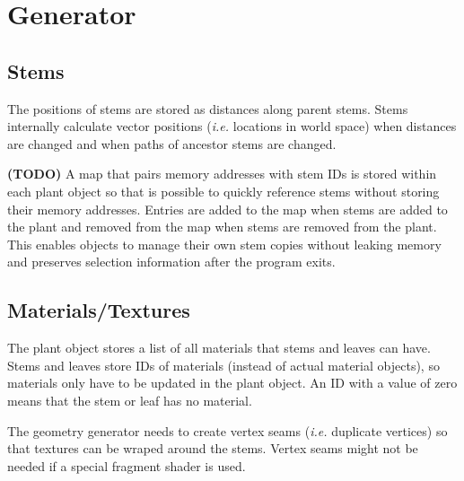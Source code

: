 \documentclass[11pt,letterpaper]{article}
\begin{document}
\section{Generator}

\subsection{Stems}

The positions of stems are stored as distances along parent stems. Stems internally calculate vector positions (\textit{i.e.} locations in world space) when distances are changed and when paths of ancestor stems are changed.

\textbf{(TODO)} A map that pairs memory addresses with stem IDs is stored within each plant object so that is possible to quickly reference stems without storing their memory addresses. Entries are added to the map when stems are added to the plant and removed from the map when stems are removed from the plant. This enables objects to manage their own stem copies without leaking memory and preserves selection information after the program exits.

\subsection{Materials/Textures}

The plant object stores a list of all materials that stems and leaves can have. Stems and leaves store IDs of materials (instead of actual material objects), so materials only have to be updated in the plant object. An ID with a value of zero means that the stem or leaf has no material.

The geometry generator needs to create vertex seams (\textit{i.e.} duplicate vertices) so that textures can be wraped around the stems. Vertex seams might not be needed if a special fragment shader is used.
\end{document}
